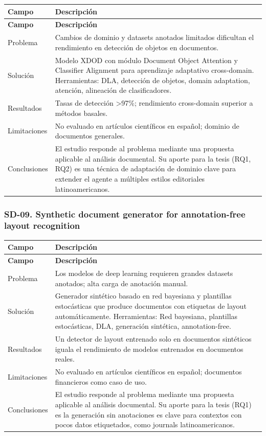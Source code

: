 \begin{longtable}{@{}>{\raggedright\arraybackslash}p{}>{\raggedright\arraybackslash}p{}@{}}
\toprule
\textbf{Campo} & \textbf{Descripción} \\
\midrule
\endfirsthead
\toprule
\textbf{Campo} & \textbf{Descripción} \\
\midrule
\endhead
\bottomrule
\endfoot
\endlastfoot
Problema & Cambios de dominio y datasets anotados limitados dificultan el rendimiento en detección de objetos en documentos. \\
Solución & Modelo XDOD con módulo Document Object Attention y Classifier Alignment para aprendizaje adaptativo cross-domain. Herramientas: DLA, detección de objetos, domain adaptation, atención, alineación de clasificadores. \\
Resultados & Tasas de detección >97\%; rendimiento cross-domain superior a métodos basales. \\
Limitaciones & No evaluado en artículos científicos en español; dominio de documentos generales. \\
Conclusiones & El estudio responde al problema mediante una propuesta aplicable al análisis documental. Su aporte para la tesis (RQ1, RQ2) es una técnica de adaptación de dominio clave para extender el agente a múltiples estilos editoriales latinoamericanos. \\
\end{longtable}

\subsubsection*{SD-09. Synthetic document generator for annotation-free layout recognition}

\begin{longtable}{@{}>{\raggedright\arraybackslash}p{}>{\raggedright\arraybackslash}p{}@{}}
\toprule
\textbf{Campo} & \textbf{Descripción} \\
\midrule
\endfirsthead
\toprule
\textbf{Campo} & \textbf{Descripción} \\
\midrule
\endhead
\bottomrule
\endfoot
\endlastfoot
Problema & Los modelos de deep learning requieren grandes datasets anotados; alta carga de anotación manual. \\
Solución & Generador sintético basado en red bayesiana y plantillas estocásticas que produce documentos con etiquetas de layout automáticamente. Herramientas: Red bayesiana, plantillas estocásticas, DLA, generación sintética, annotation-free. \\
Resultados & Un detector de layout entrenado solo en documentos sintéticos iguala el rendimiento de modelos entrenados en documentos reales. \\
Limitaciones & No evaluado en artículos científicos en español; documentos financieros como caso de uso. \\
Conclusiones & El estudio responde al problema mediante una propuesta aplicable al análisis documental. Su aporte para la tesis (RQ1) es la generación sin anotaciones es clave para contextos con pocos datos etiquetados, como journals latinoamericanos. \\
\end{longtable}

